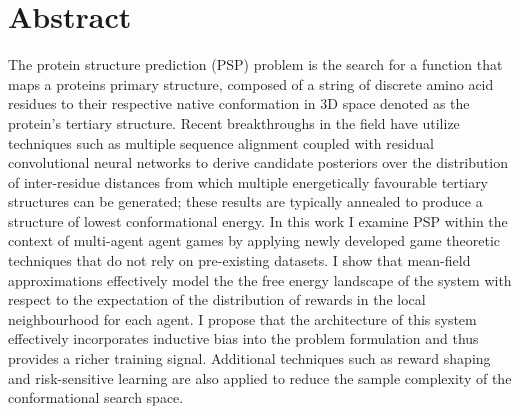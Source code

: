 
\chapter*{Abstract}

The protein structure prediction (PSP) problem  is the search for a 
function that maps a proteins primary structure, 
composed of a string of discrete amino acid residues to 
their respective native conformation in 
3D space denoted as the protein's tertiary structure. 
Recent breakthroughs in the field have utilize 
techniques such as multiple sequence alignment 
coupled with residual convolutional neural networks 
to derive candidate posteriors over the distribution 
of inter-residue distances from which multiple 
energetically favourable tertiary structures can be 
generated; these results are typically annealed to produce 
a structure of lowest conformational energy. In this work 
I examine PSP within the context of multi-agent agent games
by applying newly developed game theoretic techniques 
that do not rely on pre-existing datasets.
I show that mean-field approximations 
effectively model the the free energy landscape 
of the system with respect to the expectation of 
the distribution of rewards in the local neighbourhood 
for each agent. I propose that the architecture of 
this system effectively incorporates inductive bias 
into the problem formulation and thus provides a 
richer training signal. Additional techniques such as 
reward shaping and risk-sensitive learning are also
applied to reduce the sample complexity of the
conformational search space.
